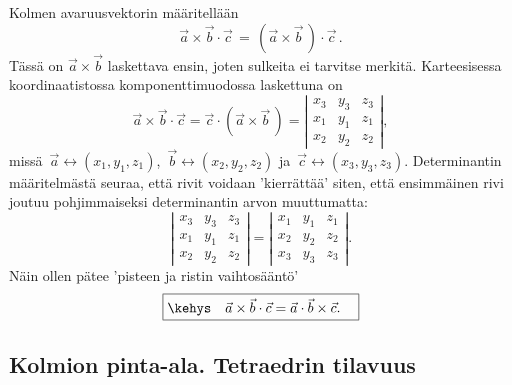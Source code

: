 Kolmen avaruusvektorin  määritellään
\[
\vec a \times \vec b \cdot \vec c \,=\, (\vec a \times \vec b\,) \cdot \vec c\,.
\]
Tässä on $\vec a \times \vec b$ laskettava ensin, joten sulkeita ei tarvitse merkitä. 
Karteesisessa koordinaatistossa komponenttimuodossa laskettuna on 
\[
\vec a \times \vec b \cdot \vec c = \vec c \cdot (\vec a \times \vec b\,) = 
\left| \begin{array}{ccc}
x_3 & y_3 & z_3 \\
x_1 & y_1 & z_1 \\
x_2 & y_2 & z_2 
\end{array} \right|,
\]
missä $\,\vec a \leftrightarrow (x_1,y_1,z_1)$, $\,\vec b \leftrightarrow (x_2,y_2,z_2)$ ja 
$\,\vec c \leftrightarrow (x_3,y_3,z_3)$. Determinantin määritelmästä seuraa, että rivit voidaan
'kierrättää' siten, että ensimmäinen rivi joutuu pohjimmaiseksi determinantin arvon muuttumatta:
\[
\left| \begin{array}{ccc}
x_3 & y_3 & z_3 \\
x_1 & y_1 & z_1 \\
x_2 & y_2 & z_2 
\end{array} \right| =
\left| \begin{array}{ccc}
x_1 & y_1 & z_1 \\
x_2 & y_2 & z_2 \\
x_3 & y_3 & z_3 
\end{array} \right|.
\]
Näin ollen pätee 'pisteen ja ristin vaihtosääntö'
\[
\boxed{\kehys\quad \vec a \times \vec b \cdot \vec c = \vec a \cdot \vec b \times \vec c. \quad}
\]

\subsection*{Kolmion pinta-ala. Tetraedrin tilavuus}

